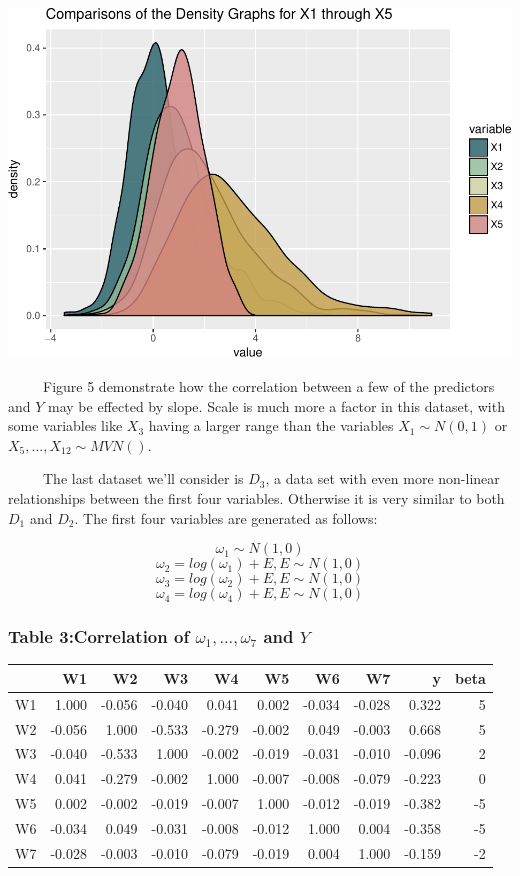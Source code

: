 \documentclass[12pt,twoside]{reedthesis}
\begin{document}
  \begin{center}\includegraphics{Thesis_files/figure-latex/unnamed-chunk-6-1} \end{center}
  
  ~~~~~Figure 5 demonstrate how the correlation between a few of the
  predictors and \(Y\) may be effected by slope. Scale is much more a
  factor in this dataset, with some variables like \(X_3\) having a larger
  range than the variables \(X_1 \sim N(0,1)\) or
  \(X_5,...,X_{12} \sim MVN()\).
  
  ~~~~~The last dataset we'll consider is \(D_3\), a data set with even
  more non-linear relationships between the first four variables.
  Otherwise it is very similar to both \(D_1\) and \(D_2\). The first four
  variables are generated as follows:
  
  \[\omega_1 \sim N(1,0)\] \[\omega_2 = log(\omega_1) + E, E \sim N(1,0)\]
  \[\omega_3 = log(\omega_2) + E, E \sim N(1,0)\]
  \[\omega_4 = log(\omega_4) + E, E \sim N(1,0)\]
  
  \subsubsection{\texorpdfstring{Table 3:Correlation of
  \(\omega_1,..., \omega_7\) and
  \(Y\)}{Table 3:Correlation of \textbackslash{}omega\_1,..., \textbackslash{}omega\_7 and Y}}\label{table-3correlation-of-omega_1...-omega_7-and-y}
  
  \begin{longtable}[]{@{}lrrrrrrrrr@{}}
  \toprule
  & W1 & W2 & W3 & W4 & W5 & W6 & W7 & y & beta\tabularnewline
  \midrule
  \endhead
  W1 & 1.000 & -0.056 & -0.040 & 0.041 & 0.002 & -0.034 & -0.028 & 0.322 &
  5\tabularnewline
  W2 & -0.056 & 1.000 & -0.533 & -0.279 & -0.002 & 0.049 & -0.003 & 0.668
  & 5\tabularnewline
  W3 & -0.040 & -0.533 & 1.000 & -0.002 & -0.019 & -0.031 & -0.010 &
  -0.096 & 2\tabularnewline
  W4 & 0.041 & -0.279 & -0.002 & 1.000 & -0.007 & -0.008 & -0.079 & -0.223
  & 0\tabularnewline
  W5 & 0.002 & -0.002 & -0.019 & -0.007 & 1.000 & -0.012 & -0.019 & -0.382
  & -5\tabularnewline
  W6 & -0.034 & 0.049 & -0.031 & -0.008 & -0.012 & 1.000 & 0.004 & -0.358
  & -5\tabularnewline
  W7 & -0.028 & -0.003 & -0.010 & -0.079 & -0.019 & 0.004 & 1.000 & -0.159
  & -2\tabularnewline
  \bottomrule
  \end{longtable}
  
\end{document}
